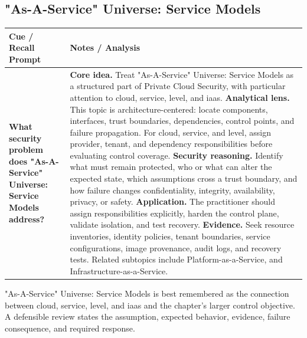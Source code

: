 \documentclass[11pt]{article}
\newcommand{\CornellHeader}{%
\rowcolor{Navy}\color{white}\bfseries Cue / Recall Prompt & \color{white}\bfseries Notes / Analysis\\\hline}
\newcommand{\CornellRow}[2]{%
\cellcolor{CueGray}\RaggedRight\textbf{#1} & \RaggedRight #2\\\hline}
\begin{document}
\subsection*{"As-A-Service" Universe: Service Models}
\begin{longtable}{>{\RaggedRight\arraybackslash}p{}|>{\RaggedRight\arraybackslash}p{}}
\CornellHeader
\CornellRow{What security problem does "As-A-Service" Universe: Service Models address?}{\textbf{Core idea.} Treat "As-A-Service" Universe: Service Models as a structured part of Private Cloud Security, with particular attention to cloud, service, level, and iaas. \textbf{Analytical lens.} This topic is architecture-centered: locate components, interfaces, trust boundaries, dependencies, control points, and failure propagation. For cloud, service, and level, assign provider, tenant, and dependency responsibilities before evaluating control coverage. \textbf{Security reasoning.} Identify what must remain protected, who or what can alter the expected state, which assumptions cross a trust boundary, and how failure changes confidentiality, integrity, availability, privacy, or safety. \textbf{Application.} The practitioner should assign responsibilities explicitly, harden the control plane, validate isolation, and test recovery. \textbf{Evidence.} Seek resource inventories, identity policies, tenant boundaries, service configurations, image provenance, audit logs, and recovery tests. Related subtopics include Platform-as-a-Service, and Infrastructure-as-a-Service.}
\end{longtable}
\begin{topicsummary}
"As-A-Service" Universe: Service Models is best remembered as the connection between cloud, service, level, and iaas and the chapter's larger control objective. A defensible review states the assumption, expected behavior, evidence, failure consequence, and required response.
\end{topicsummary}
\end{document}
